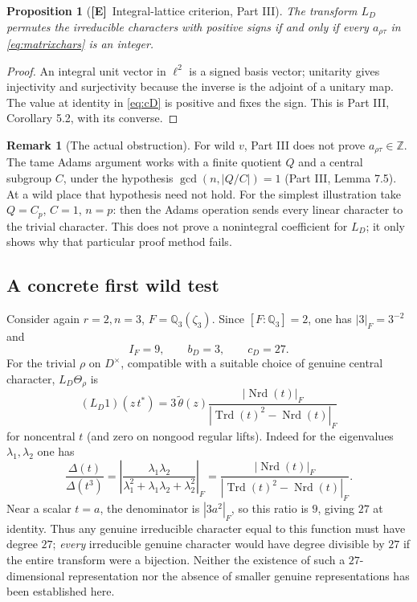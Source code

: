 \documentclass[11pt]{article}
\newcommand{\Z}{\mathbb Z}
\newcommand{\Nrd}{\operatorname{Nrd}}
\newcommand{\Etag}{\textnormal{\textbf{[E]}}}
\theoremstyle{plain}
\newtheorem{proposition}[theorem]{Proposition}
\theoremstyle{definition}
\newtheorem{remark}[theorem]{Remark}
\begin{document}
\begin{proposition}[\Etag\ Integral-lattice criterion, Part III]\label{prop:int}
The transform $L_D$ permutes the irreducible characters with
positive signs if and only if every $a_{\rho\tau}$ in
\eqref{eq:matrixchars} is an integer.
\end{proposition}
\begin{proof}
An integral unit vector in $\ell^2$ is a signed basis vector;
unitarity gives injectivity and surjectivity because the inverse
is the adjoint of a unitary map.  The value at identity in
\eqref{eq:cD} is positive and fixes the sign.
This is Part III, Corollary 5.2, with its converse.
\end{proof}

\begin{remark}[The actual obstruction]
For wild $v$, Part III does not prove
$a_{\rho\tau}\in\Z$.  The tame Adams argument works with a
finite quotient $Q$ and a central subgroup $C$, under the
hypothesis $\gcd(n,|Q/C|)=1$ (Part III, Lemma 7.5).
At a wild place that hypothesis need not hold.  For the
simplest illustration take $Q=C_p$, $C=1$, $n=p$: then the
Adams operation sends every linear character to the trivial
character.  This does not prove a nonintegral coefficient for
$L_D$; it only shows why that particular proof method fails.
\end{remark}

\subsection{A concrete first wild test}\label{subsec:examplewild}
Consider again $r=2,n=3$, $F=\mathbb Q_3(\zeta_3)$.
Since $[F:\mathbb Q_3]=2$, one has
$|3|_F=3^{-2}$ and
\begin{equation}\label{eq:wildconstants}
 I_F=9,\qquad b_D=3,\qquad c_D=27.
\end{equation}
For the trivial $\rho$ on $D^\times$, compatible with a suitable
choice of genuine central character, $L_D\Theta_\rho$ is
\begin{equation}\label{eq:wildexplicit}
 (L_D1)(z\,t^*)
 =3\,\widetilde\theta(z)
 \frac{|\Nrd(t)|_F}
 {|\operatorname{Trd}(t)^2-\Nrd(t)|_F}
\end{equation}
for noncentral $t$ (and zero on nongood regular lifts).
Indeed for the eigenvalues $\lambda_1,\lambda_2$ one has
\[
 \frac{\Delta(t)}{\Delta(t^3)}
 =\left|\frac{\lambda_1\lambda_2}
 {\lambda_1^2+\lambda_1\lambda_2+\lambda_2^2}\right|_F
 =\frac{|\Nrd(t)|_F}{|\operatorname{Trd}(t)^2-\Nrd(t)|_F}.
\]
Near a scalar $t=a$, the denominator is $|3a^2|_F$, so
this ratio is $9$, giving $27$ at identity.
Thus any genuine irreducible character equal to this function
must have degree $27$; \emph{every} irreducible genuine character
would have degree divisible by $27$ if the entire transform were a
bijection.  Neither the existence of such a $27$-dimensional
representation nor the absence of smaller genuine representations
has been established here.
\end{document}
